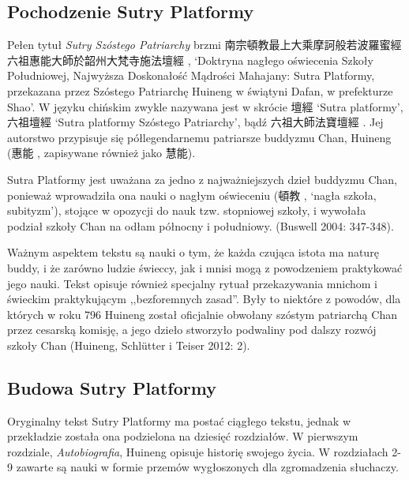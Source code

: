 \subsection{Pochodzenie Sutry Platformy}

Pełen tytuł \textit{Sutry Szóstego Patriarchy} brzmi 南宗頓教最上大乘摩訶般若波羅蜜經六祖惠能大師於韶州大梵寺施法壇經 , `Doktryna nagłego oświecenia Szkoły Południowej, Najwyższa Doskonałość Mądrości Mahajany: Sutra Platformy, przekazana przez Szóstego Patriarchę Huineng w świątyni Dafan, w prefekturze Shao'. W języku chińskim zwykle nazywana jest w skrócie 壇經  `Sutra platformy', 六祖壇經  `Sutra platformy Szóstego Patriarchy', bądź 六祖大師法寶壇經 . Jej autorstwo przypisuje się półlegendarnemu patriarsze buddyzmu Chan, Huineng (惠能 , zapisywane również jako 慧能). %

Sutra Platformy jest uważana za jedno z najważniejszych dzieł buddyzmu Chan, ponieważ wprowadziła ona nauki o nagłym oświeceniu (頓教 , `nagła szkoła, subityzm'), stojące w opozycji do nauk tzw. stopniowej szkoły, i wywołała podział szkoły Chan na odłam północny i południowy. %
(Buswell 2004: 347-348).%

Ważnym aspektem tekstu są nauki o tym, że każda czująca istota ma naturę buddy, i że zarówno ludzie świeccy, jak i mnisi mogą z powodzeniem praktykować jego nauki. Tekst opisuje również specjalny rytuał przekazywania mnichom i świeckim praktykującym ,,bezforemnych zasad''. %
Były to niektóre z powodów, dla których w roku 796 Huineng został oficjalnie obwołany szóstym patriarchą Chan przez cesarską komisję, a jego dzieło stworzyło podwaliny pod dalszy rozwój szkoły Chan (Huineng, Schlütter i Teiser 2012: 2).

\subsection{Budowa Sutry Platformy}
Oryginalny tekst Sutry Platformy ma postać ciągłego tekstu, jednak w przekładzie została ona podzielona na dziesięć rozdziałów. W pierwszym rozdziale, \textit{Autobiografia}, Huineng opisuje historię swojego życia. W rozdziałach 2-9 zawarte są nauki w formie przemów wygłoszonych dla zgromadzenia słuchaczy. 
\fi

